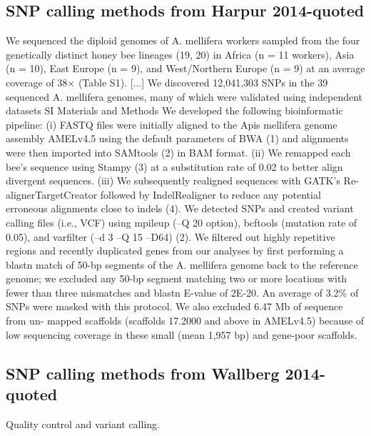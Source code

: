 \documentclass[12pt]{report}
\begin{document}
\subsection{SNP calling methods from Harpur 2014-quoted}
We sequenced the diploid genomes of A. mellifera workers sampled from the four genetically distinct honey bee lineages (19, 20) in Africa (n = 11 workers), Asia (n = 10), East Europe (n = 9), and West/Northern Europe (n = 9) at an average coverage of 38× (Table S1). [...] We discovered 12,041,303 SNPs in the 39 sequenced A. mellifera genomes, many of which were validated using independent datasets
SI Materials and Methods
We developed the following bioinformatic pipeline: (i) FASTQ
files were initially aligned to the Apis mellifera genome assembly
AMELv4.5 using the default parameters of BWA (1) and
alignments were then imported into SAMtools (2) in BAM
format. (ii) We remapped each bee’s sequence using Stampy (3)
at a substitution rate of 0.02 to better align divergent sequences.
(iii) We subsequently realigned sequences with GATK’s Re-
alignerTargetCreator followed by IndelRealigner to reduce any
potential erroneous alignments close to indels (4). We detected
SNPs and created variant calling files (i.e., VCF) using mpileup
(–Q 20 option), bcftools (mutation rate of 0.05), and varfilter (–d 3 –Q 15 –D64) (2). We filtered out highly repetitive regions and
recently duplicated genes from our analyses by first performing
a blastn match of 50-bp segments of the A. mellifera genome back
to the reference genome; we excluded any 50-bp segment matching
two or more locations with fewer than three mismatches and blastn
E-value of 2E-20. An average of 3.2\% of SNPs were masked with
this protocol. We also excluded 6.47 Mb of sequence from un-
mapped scaffolds (scaffolds 17.2000 and above in AMELv4.5)
because of low sequencing coverage in these small (mean 1,957 bp)
and gene-poor scaffolds.

\subsection{SNP calling methods from Wallberg 2014-quoted}
Quality control and variant calling.
	
\end{document}
